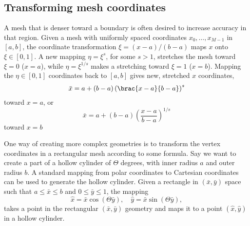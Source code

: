 \subsection{Transforming mesh coordinates}
\label{langtangen:mesh:transform:cyl}

A mesh that is denser toward a boundary is often desired to increase
accuracy in that region. Given a mesh with uniformly spaced coordinates
$x_0,\ldots,x_{M-1}$ in $[a,b]$, the coordinate transformation $\xi =
(x-a)/(b-a)$ maps $x$ onto $\xi\in [0,1]$. A new mapping $\eta = \xi^s$,
for some $s>1$, stretches the mesh toward $\xi=0$ ($x=a$), while $\eta
= \xi^{1/s}$ makes a stretching toward $\xi=1$ ($x=b$).  Mapping the
$\eta\in[0,1]$ coordinates back to $[a,b]$ gives new, stretched $x$
coordinates,
\begin{equation}
  \bar x = a + (b-a)\left( \brac{x-a}{b-a}\right)^s
\end{equation}
toward $x=a$, or
\begin{equation}
  \bar x = a + (b-a)\left(\frac{x-a}{b-a}\right)^{1/s}
\end{equation}
toward $x=b$

One way of creating more complex geometries is to transform the
vertex coordinates in a rectangular mesh according to some formula.
Say we want to create a part of a hollow cylinder of $\Theta$ degrees,
with inner radius $a$ and outer radius $b$. A standard mapping from
polar coordinates to Cartesian coordinates can be used to generate the
hollow cylinder. Given a rectangle in $(\bar x, \bar y)$ space such
that $a\leqslant \bar x\leqslant b$ and $0\leqslant \bar y\leqslant 1$,
the mapping
\begin{equation}
 \hat x = \bar x\cos (\Theta \bar y),\quad \hat y
    = \bar x\sin (\Theta \bar y),
\end{equation}
takes a point in the rectangular $(\bar x,\bar y)$ geometry and maps it
to a point $(\hat x, \hat y)$ in a hollow cylinder.

